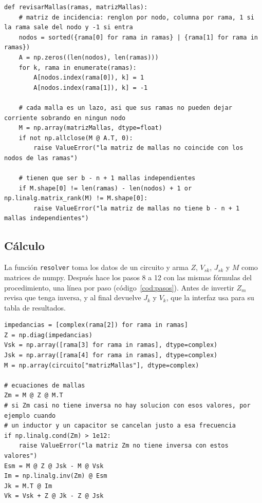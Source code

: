 \documentclass[12pt, letterpaper]{article}
\begin{document}
\begin{lstlisting}[caption={Función \texttt{revisarMallas} de \texttt{codigo/mallas.py}.}, label={cod:revisar}]
def revisarMallas(ramas, matrizMallas):
    # matriz de incidencia: renglon por nodo, columna por rama, 1 si la rama sale del nodo y -1 si entra
    nodos = sorted({rama[0] for rama in ramas} | {rama[1] for rama in ramas})
    A = np.zeros((len(nodos), len(ramas)))
    for k, rama in enumerate(ramas):
        A[nodos.index(rama[0]), k] = 1
        A[nodos.index(rama[1]), k] = -1

    # cada malla es un lazo, asi que sus ramas no pueden dejar corriente sobrando en ningun nodo
    M = np.array(matrizMallas, dtype=float)
    if not np.allclose(M @ A.T, 0):
        raise ValueError("la matriz de mallas no coincide con los nodos de las ramas")

    # tienen que ser b - n + 1 mallas independientes
    if M.shape[0] != len(ramas) - len(nodos) + 1 or np.linalg.matrix_rank(M) != M.shape[0]:
        raise ValueError("la matriz de mallas no tiene b - n + 1 mallas independientes")
\end{lstlisting}

\subsection{Cálculo}

La función \texttt{resolver} toma los datos de un circuito y arma $Z$, $V_{sk}$, $J_{sk}$ y $M$ como matrices de
numpy. Después hace los pasos 8 a 12 con las mismas fórmulas del procedimiento, una línea por paso
(código~\ref{cod:pasos}). Antes de invertir $Z_m$ revisa que tenga inversa, y al final devuelve $J_k$ y $V_k$, que la
interfaz usa para su tabla de resultados.

\begin{lstlisting}[caption={Matrices de entrada y pasos 8 a 12 en la función \texttt{resolver} de \texttt{codigo/mallas.py}.}, label={cod:pasos}]
impedancias = [complex(rama[2]) for rama in ramas]
Z = np.diag(impedancias)
Vsk = np.array([rama[3] for rama in ramas], dtype=complex)
Jsk = np.array([rama[4] for rama in ramas], dtype=complex)
M = np.array(circuito["matrizMallas"], dtype=complex)

# ecuaciones de mallas
Zm = M @ Z @ M.T
# si Zm casi no tiene inversa no hay solucion con esos valores, por ejemplo cuando
# un inductor y un capacitor se cancelan justo a esa frecuencia
if np.linalg.cond(Zm) > 1e12:
    raise ValueError("la matriz Zm no tiene inversa con estos valores")
Esm = M @ Z @ Jsk - M @ Vsk
Im = np.linalg.inv(Zm) @ Esm
Jk = M.T @ Im
Vk = Vsk + Z @ Jk - Z @ Jsk
\end{lstlisting}
\end{document}
